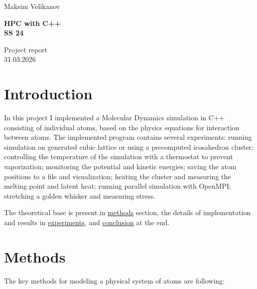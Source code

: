 \documentclass[12pt,a4paper]{article}
\title{}
\author{}
\begin{document}
\parbox{0.333\textwidth}{
	Maksim Velikanov \\[0mm]
}
\parbox{0.333\textwidth}{\vspace*{1mm}\begin{center}\large\bf%
		HPC with C++\\[0mm]
		SS 24\\[0mm]
\end{center}}
\parbox{0.333\textwidth}{
	\begin{flushright}
		Project report\\[0mm]
		31.03.2026\\[0mm]
	\end{flushright}
}
\par\vspace{-5mm}
\vspace*{2mm}
\raisebox{1.19cm}{%
	\textcolor{freiburg-gray}{\rule{\textwidth}{1.1mm}}}

\bigskip




\section{Introduction}

In this project I implemented a Molecular Dynamics simulation in C++ consisting of individual atoms, based on the physics equations for interaction between atoms. The implemented program contains several experiments: running simulation on generated cubic lattice or using a precomputed icosahedron cluster; controlling the temperature of the simulation with a thermostat to prevent vaporization; monitoring the potential and kinetic energies; saving the atom positions to a file and visualization; heating the cluster and measuring the melting point and latent heat; running parallel simulation with OpenMPI; stretching a golden whisker and measuring stress.

The theoretical base is present in \hyperref[methods]{methods} section, the details of implementation and results in \hyperref[experiments]{experiments}, and \hyperref[conclusion]{conclusion} at the end.

\section{Methods}
\label{methods}

The key methods for modeling a physical system of atoms are following:
\end{document}
